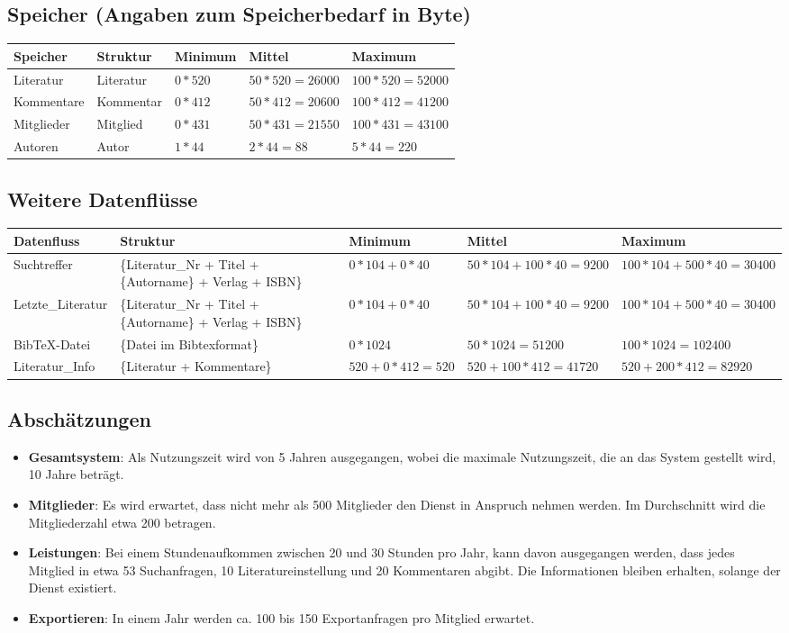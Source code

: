 \subsection{Speicher (Angaben zum Speicherbedarf in Byte)}
\begin{tabular}[ht]{|l|l|l|l|l|}
\hline
Speicher & Struktur & Minimum & Mittel & Maximum \\
\hline\hline
Literatur & {Literatur} & $0*520$ & $50*520=26000$ & $100*520=52000$ \\
Kommentare & {Kommentar} & $0*412$ & $50*412=20600$ & $100*412=41200$ \\
Mitglieder & {Mitglied}  & $0*431$ & $50*431=21550$ & $100*431=43100$ \\
Autoren & {Autor} & $1*44$ & $2*44=88$ & $5*44=220$ \\ 
\hline
\end{tabular}

\subsection{Weitere Datenflüsse}
\begin{tabular}[ht]{|l|p{4cm}|p{2cm}|p{2cm}|p{2cm}|}
\hline
Datenfluss & Struktur & Minimum & Mittel & Maximum \\
\hline\hline

Suchtreffer & \{Literatur\_Nr + Titel + \{Autorname\} + Verlag + ISBN\}  & $0*104 + 0*40$ & $50*104 + 100*40=9200$ & $100*104 + 500*40=30400$ \\
Letzte\_Literatur & \{Literatur\_Nr + Titel + \{Autorname\} + Verlag + ISBN\}  & $0*104 + 0*40$ & $50*104 + 100*40=9200$ & $100*104 + 500*40=30400$ \\
BibTeX-Datei & \{Datei im Bibtexformat\} & $0*1024$ & $50*1024=51200$ & $100*1024=102400$ \\
Literatur\_Info & \{Literatur + Kommentare\} & $520 + 0*412=520$ & $520 + 100*412=41720$ & $520 + 200*412=82920$ \\
\hline
\end{tabular}

\subsection{Abschätzungen}
\begin{itemize}
 \item \textbf{Gesamtsystem}: Als Nutzungszeit wird von 5 Jahren ausgegangen, wobei die maximale Nutzungszeit, 
die an das System gestellt wird, 10 Jahre betr\"agt.
 \item \textbf{Mitglieder}: Es wird erwartet, dass nicht mehr als 500 Mitglieder den Dienst in Anspruch nehmen werden. Im Durchschnitt wird
 die Mitgliederzahl etwa 200 betragen.
\item \textbf{Leistungen}: Bei einem Stundenaufkommen zwischen 20 und 30 Stunden pro Jahr, kann davon ausgegangen werden, dass jedes 
Mitglied in etwa 53 Suchanfragen, 10 Literatureinstellung und 20 Kommentaren abgibt. Die Informationen bleiben erhalten, solange der Dienst existiert.  
\item \textbf{Exportieren}: In einem Jahr werden ca. 100 bis 150 Exportanfragen pro Mitglied erwartet.
\end{itemize}

